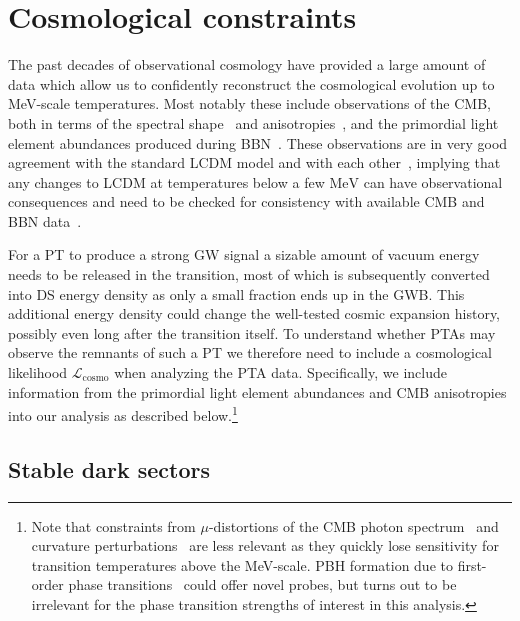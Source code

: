 \section{Cosmological constraints}
\label{sec:constraints}

The past decades of observational cosmology have provided a large amount of data which allow us to confidently reconstruct the cosmological evolution up to MeV-scale temperatures. Most notably these include observations of the CMB, both in terms of the spectral shape~\cite{Fixsen:1996nj} and anisotropies~\cite{Planck:2018vyg}, and the primordial light element abundances produced during \ac{BBN}~\cite{ParticleDataGroup:2022pth}. These observations are  in very good agreement with the standard \ac{LCDM} model and with each other~\cite{ParticleDataGroup:2022pth}, implying that any changes to \ac{LCDM}  at temperatures below a few $\mathrm{MeV}$ can have observational consequences and need to be checked for consistency with available \ac{CMB} and \ac{BBN} 
data~\cite{Planck:2018vyg,Hufnagel:2018bjp,Forestell:2018txr,Depta:2020zbh,Depta:2020mhj,Kawasaki:2020qxm,Yeh:2022heq}.

For a \ac{PT} to produce a strong \ac{GW} signal a sizable amount of vacuum energy needs to be released in the transition, most of which is subsequently converted into \ac{DS} energy density as only a small fraction ends up in the \ac{GWB}. This additional energy density could change the well-tested cosmic expansion history, possibly even long after the transition itself.  To understand whether \acp{PTA} may observe the remnants of such a \ac{PT} we therefore need to include a cosmological likelihood $\mathcal{L}_\text{cosmo}$ when analyzing the \ac{PTA} data. Specifically, we include information from the primordial light element abundances and \ac{CMB} anisotropies into our analysis as described below.\footnote{Note that constraints from $\mu$-distortions of the \ac{CMB} photon spectrum~\cite{Ramberg:2022irf} and curvature perturbations~\cite{Liu:2022lvz} are less relevant as they quickly lose sensitivity for transition temperatures above the MeV-scale. \ac{PBH} formation due to first-order phase transitions~\cite{Lewicki:2023ioy,Gouttenoire:2023naa,Baker:2021nyl} could offer novel probes, but turns out to be irrelevant for the phase transition strengths of interest in this analysis.}

\subsection{Stable dark sectors}

